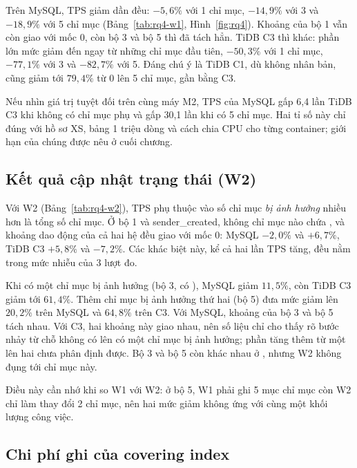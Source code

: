 Trên MySQL, TPS giảm dần đều: $-5{,}6\%$ với 1 chỉ mục, $-14{,}9\%$ với 3 và $-18{,}9\%$ với 5 chỉ mục (Bảng~\ref{tab:rq4-w1}, Hình~\ref{fig:rq4}). Khoảng của bộ 1 vẫn còn giao với mốc 0, còn bộ 3 và bộ 5 thì đã tách hẳn. TiDB C3 thì khác: phần lớn mức giảm đến ngay từ những chỉ mục đầu tiên, $-50{,}3\%$ với 1 chỉ mục, $-77{,}1\%$ với 3 và $-82{,}7\%$ với 5. Đáng chú ý là TiDB C1, dù không nhân bản, cũng giảm tới $79{,}4\%$ từ 0 lên 5 chỉ mục, gần bằng C3.

Nếu nhìn giá trị tuyệt đối trên cùng máy M2, TPS của MySQL gấp 6,4 lần TiDB C3 khi không có chỉ mục phụ và gấp 30,1 lần khi có 5 chỉ mục. Hai tỉ số này chỉ đúng với hồ sơ XS, bảng 1 triệu dòng và cách chia CPU cho từng container; giới hạn của chúng được nêu ở cuối chương.


\subsection{Kết quả cập nhật trạng thái (W2)}

Với W2 (Bảng~\ref{tab:rq4-w2}), TPS phụ thuộc vào số chỉ mục \emph{bị ảnh hưởng} nhiều hơn là tổng số chỉ mục. Ở bộ 1 và sender\_created, không chỉ mục nào chứa , và khoảng dao động của cả hai hệ đều giao với mốc 0: MySQL $-2{,}0\%$ và $+6{,}7\%$, TiDB C3 $+5{,}8\%$ và $-7{,}2\%$. Các khác biệt này, kể cả hai lần TPS tăng, đều nằm trong mức nhiễu của 3 lượt đo.

Khi có một chỉ mục bị ảnh hưởng (bộ 3, có ), MySQL giảm $11{,}5\%$, còn TiDB C3 giảm tới $61{,}4\%$. Thêm chỉ mục bị ảnh hưởng thứ hai (bộ 5) đưa mức giảm lên $20{,}2\%$ trên MySQL và $64{,}8\%$ trên C3. Với MySQL, khoảng của bộ 3 và bộ 5 tách nhau. Với C3, hai khoảng này giao nhau, nên số liệu chỉ cho thấy rõ bước nhảy từ chỗ không có lên có một chỉ mục bị ảnh hưởng; phần tăng thêm từ một lên hai chưa phân định được. Bộ 3 và bộ 5 còn khác nhau ở , nhưng W2 không đụng tới chỉ mục này.

Điều này cần nhớ khi so W1 với W2: ở bộ 5, W1 phải ghi 5 mục chỉ mục còn W2 chỉ làm thay đổi 2 chỉ mục, nên hai mức giảm không ứng với cùng một khối lượng công việc.

\subsection{Chi phí ghi của covering index}


